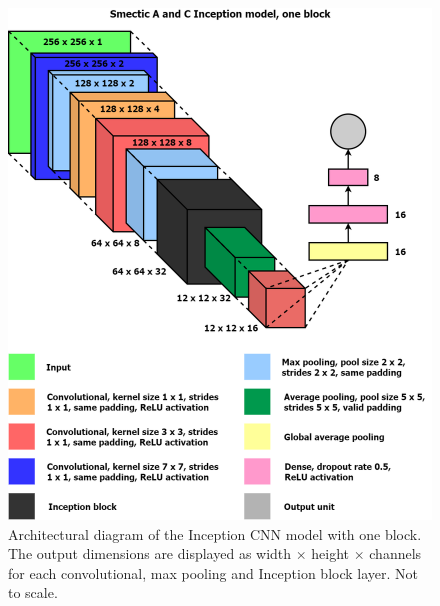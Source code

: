\documentclass[12pt]{article}
\begin{document}
\begin{figure}[!htb]
	\centering
    \includegraphics[width=5.393in]{images/inception_model.png}
    \caption{Architectural diagram of the Inception CNN model with one block. The output dimensions are displayed as width $\times$ height $\times$ channels for each convolutional, max pooling and Inception block layer. Not to scale.}
\end{figure} 
\end{document}
